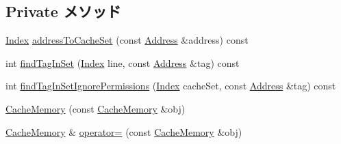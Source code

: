 \subsection*{Private メソッド}
\begin{DoxyCompactItemize}
\item 
\hyperlink{TypeDefines_8hh_a39642de41f3574937f399f4fab25ba18}{Index} \hyperlink{classCacheMemory_ab8af076beefca7ea17d6ffbf639456db}{addressToCacheSet} (const \hyperlink{classAddress}{Address} \&address) const 
\item 
int \hyperlink{classCacheMemory_ac32dac48596332a7537a1e3c31cfd3c0}{findTagInSet} (\hyperlink{TypeDefines_8hh_a39642de41f3574937f399f4fab25ba18}{Index} line, const \hyperlink{classAddress}{Address} \&tag) const 
\item 
int \hyperlink{classCacheMemory_ad7d6ceb226fbf63dc2c91a61aa57d98a}{findTagInSetIgnorePermissions} (\hyperlink{TypeDefines_8hh_a39642de41f3574937f399f4fab25ba18}{Index} cacheSet, const \hyperlink{classAddress}{Address} \&tag) const 
\item 
\hyperlink{classCacheMemory_a15c87d4f0ba579b954e84d6eee946d46}{CacheMemory} (const \hyperlink{classCacheMemory}{CacheMemory} \&obj)
\item 
\hyperlink{classCacheMemory}{CacheMemory} \& \hyperlink{classCacheMemory_a3ba0e3a7cc49aede911aa79977fc4128}{operator=} (const \hyperlink{classCacheMemory}{CacheMemory} \&obj)
\end{DoxyCompactItemize}
